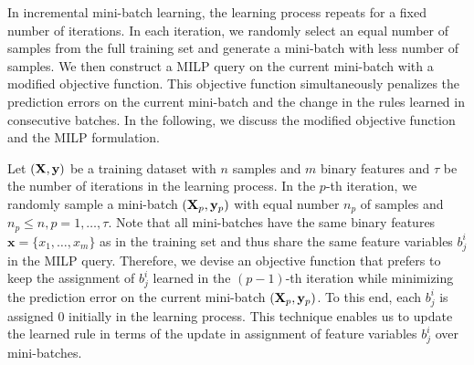 In incremental mini-batch learning, the learning process repeats for a fixed number of iterations. In each iteration, we randomly select an equal number of samples from the full training set and generate a mini-batch with less number of samples.  We then construct a MILP query on the current mini-batch with a modified objective function. This objective function simultaneously penalizes the prediction errors
on the current mini-batch and the change in the rules learned in consecutive batches.  
In the following, we discuss the modified objective function and the  MILP formulation.










Let $ ({\mathbf{X}},\mathbf{y})$ be a training dataset with $ n $ samples and $ m $ binary features and $ \tau $ be the number of iterations in the learning process. In the $ p $-th iteration, we randomly sample a mini-batch $ ({\mathbf{X}}_p,\mathbf{y}_p)$ with equal number $ n_p $ of  samples and $ n_p \le n, p=1,\dots, \tau $. Note that all mini-batches have the same  binary features $ \mathbf{x} =\{x_1, \dots, x_m\} $ as in the  training set and thus share the same feature variables $ b_j^i $ in the MILP query. Therefore, we devise an objective function that prefers to keep the  assignment of $ b_j^i $ learned in the $ (p-1) $-th iteration while minimizing the prediction error on  the current mini-batch $ ({\mathbf{X}}_p,\mathbf{y}_p)$. To this end, each $ b_j^i $ is assigned $ 0 $ initially in the learning process.  This technique  enables us to update the learned rule in terms of the update in  assignment of feature variables $ b_j^i $ over mini-batches. 


